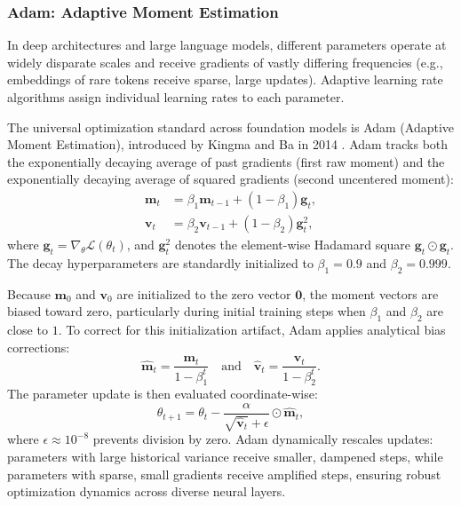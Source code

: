 \documentclass[../../main.tex]{subfiles}
\begin{document}
\subsubsection{Adam: Adaptive Moment Estimation}

In deep architectures and large language models, different parameters operate at widely disparate scales and receive gradients of vastly differing frequencies (e.g., embeddings of rare tokens receive sparse, large updates). Adaptive learning rate algorithms assign individual learning rates to each parameter.

The universal optimization standard across foundation models is Adam (Adaptive Moment Estimation), introduced by Kingma and Ba in 2014 \citep{kingma2014adam}. Adam tracks both the exponentially decaying average of past gradients (first raw moment) and the exponentially decaying average of squared gradients (second uncentered moment):
\begin{align}
\mathbf{m}_t &= \beta_1 \mathbf{m}_{t-1} + (1 - \beta_1) \mathbf{g}_t, \label{eq:adam_m} \\
\mathbf{v}_t &= \beta_2 \mathbf{v}_{t-1} + (1 - \beta_2) \mathbf{g}_t^2, \label{eq:adam_v}
\end{align}
where $\mathbf{g}_t = \nabla_\theta \mathcal{L}(\theta_t)$, and $\mathbf{g}_t^2$ denotes the element-wise Hadamard square $\mathbf{g}_t \odot \mathbf{g}_t$. The decay hyperparameters are standardly initialized to $\beta_1 = 0.9$ and $\beta_2 = 0.999$.

Because $\mathbf{m}_0$ and $\mathbf{v}_0$ are initialized to the zero vector $\mathbf{0}$, the moment vectors are biased toward zero, particularly during initial training steps when $\beta_1$ and $\beta_2$ are close to $1$. To correct for this initialization artifact, Adam applies analytical bias corrections:
\begin{equation}
\hat{\mathbf{m}}_t = \frac{\mathbf{m}_t}{1 - \beta_1^t} \quad \text{and} \quad \hat{\mathbf{v}}_t = \frac{\mathbf{v}_t}{1 - \beta_2^t}.
\end{equation}
The parameter update is then evaluated coordinate-wise:
\begin{equation}
\theta_{t+1} = \theta_t - \frac{\alpha}{\sqrt{\hat{\mathbf{v}}_t} + \epsilon} \odot \hat{\mathbf{m}}_t,
\end{equation}
where $\epsilon \approx 10^{-8}$ prevents division by zero. Adam dynamically rescales updates: parameters with large historical variance receive smaller, dampened steps, while parameters with sparse, small gradients receive amplified steps, ensuring robust optimization dynamics across diverse neural layers.
\end{document}
